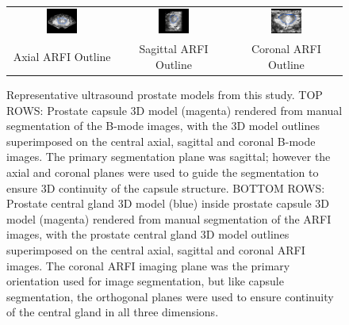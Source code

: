 \begin{figure}
\vspace{3 mm}
\begin{tabular}{ccc}
\includegraphics[width=0.3\textwidth]{tyler/axial_ARFI.png} &
\includegraphics[width=0.3\textwidth]{tyler/sagittal_ARFI.png} &
\includegraphics[width=0.3\textwidth]{tyler/coronal_ARFI.png} \\
Axial ARFI Outline & Sagittal ARFI Outline & Coronal ARFI Outline \\
\end{tabular}
\caption{Representative ultrasound prostate models from this study.  TOP ROWS:
    Prostate capsule 3D model (magenta) rendered from manual segmentation of
    the B-mode images, with the 3D model outlines superimposed on the central
    axial, sagittal and coronal B-mode images.  The primary segmentation plane
    was sagittal; however the axial and coronal planes were used to guide the
    segmentation to ensure 3D continuity of the capsule structure.  BOTTOM
    ROWS: Prostate central gland 3D model (blue) inside prostate capsule 3D model (magenta) rendered from manual
    segmentation of the ARFI images, with the prostate central gland 3D model outlines superimposed on
    the central axial, sagittal and coronal ARFI images.  The coronal ARFI
    imaging plane was the primary orientation used for image segmentation, but
    like capsule segmentation, the orthogonal planes were used to ensure continuity of
    the central gland in all three dimensions.}
\label{fig:arfi_segs} 
\end{figure}
